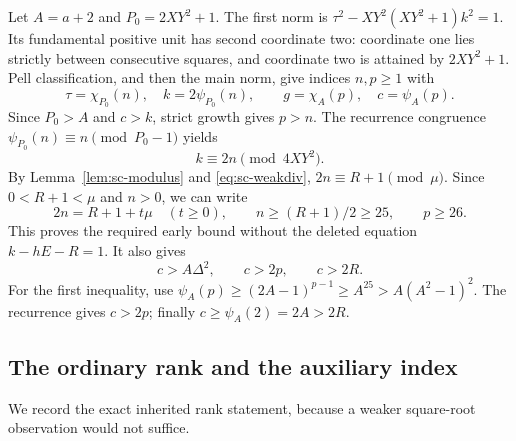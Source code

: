 Let $A=a+2$ and $P_0=2XY^2+1$.  The first norm is
$\tau^2-XY^2(XY^2+1)k^2=1$.  Its fundamental positive unit has second
coordinate two: coordinate one lies strictly between consecutive
squares, and coordinate two is attained by $2XY^2+1$.  Pell
classification, and then the main norm, give indices $n,p\ge1$ with
\begin{equation}\label{eq:sc-indices}
 \tau=\chi_{P_0}(n),\quad k=2\psi_{P_0}(n),
 \qquad g=\chi_A(p),\quad c=\psi_A(p).
\end{equation}
Since $P_0>A$ and $c>k$, strict growth gives $p>n$.
The recurrence congruence $\psi_{P_0}(n)\equiv n\pmod{P_0-1}$ yields
\begin{equation}\label{eq:sc-firstcong}
 k\equiv2n\pmod{4XY^2}.
\end{equation}
By Lemma~\ref{lem:sc-modulus} and \eqref{eq:sc-weakdiv},
$2n\equiv R+1\pmod\mu$.  Since $0<R+1<\mu$ and $n>0$, we can write
\begin{equation}\label{eq:sc-early}
 2n=R+1+t\mu\quad(t\ge0),\qquad n\ge(R+1)/2\ge25,
 \qquad p\ge26.
\end{equation}
This proves the required early bound without the deleted equation
$k-hE-R=1$.  It also gives
\begin{equation}\label{eq:sc-large}
 c>A\Delta^2,\qquad c>2p,\qquad c>2R.
\end{equation}
For the first inequality, use
$\psi_A(p)\ge(2A-1)^{p-1}\ge A^{25}>A(A^2-1)^2$.
The recurrence gives $c>2p$; finally $c\ge\psi_A(2)=2A>2R$.

\subsection{The ordinary rank and the auxiliary index}

We record the exact inherited rank statement, because a weaker
square-root observation would not suffice.

